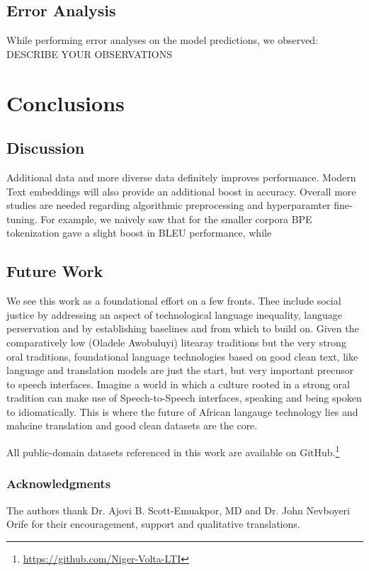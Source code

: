 \documentclass{article} %
\begin{document}
\subsection{Error Analysis}
While performing error analyses on the model predictions, we observed: DESCRIBE YOUR OBSERVATIONS

\section{Conclusions}


\subsection{Discussion}
Additional data and more diverse data definitely improves performance. Modern Text embeddings will also provide an additional boost in accuracy. Overall more studies are needed regarding algorithmic preprocessing and hyperparamter fine-tuning. For example, we naively saw that for the smaller corpora BPE tokenization gave a slight boost in BLEU performance, while 


\subsection{Future Work}
We see this work as a foundational effort on a few fronts. Thee include social justice by addressing an aspect of technological language inequality, language perservation and by establishing baselines and from which to build on. Given the comparatively low (Oladele Awobuluyi) litearay traditions but the very strong oral traditions, foundational language technologies based on good clean text, like language and translation models are just the start, but very important precusor to speech interfaces. Imagine a world in which a culture rooted in a strong oral tradition can make use of Speech-to-Speech interfaces, speaking and being spoken to idiomatically. This is where the future of African langauge technology lies and mahcine translation and good clean datasets are the core.   



All public-domain datasets referenced in this work are available on GitHub.\footnote{\url{https://github.com/Niger-Volta-LTI}}

\subsubsection*{Acknowledgments}
The authors thank Dr. Ajovi B. Scott-Emuakpor, MD and Dr. John Nevboyeri Orife for their encouragement, support and qualitative translations.



\end{document}
